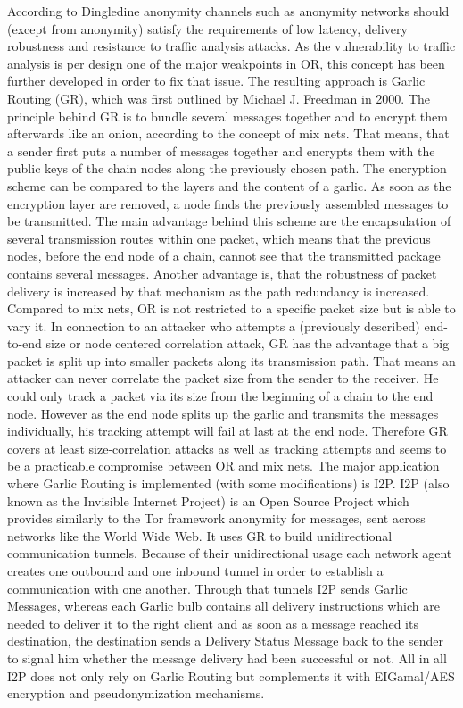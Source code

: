\documentclass{sig-alternate}
\begin{document}
According to Dingledine\cite{dingledine2000free} anonymity channels such as anonymity networks should (except from anonymity) satisfy the requirements of low latency, delivery robustness and resistance to traffic analysis attacks. As the vulnerability to traffic analysis is per design one of the major weakpoints in OR, this concept has been further developed in order to fix that issue. The resulting approach is Garlic Routing (GR), which was first outlined by Michael J. Freedman in 2000. The principle behind GR is to bundle several messages together and to encrypt them afterwards like an onion, according to the concept of mix nets. That means, that a sender first puts a number of messages together and encrypts them with the public keys of the chain nodes along the previously chosen path. The encryption scheme can be compared to the layers and the content of a garlic. As soon as the encryption layer are removed, a node finds the previously assembled messages to be transmitted. The main advantage behind this scheme are the encapsulation of several transmission routes within one packet, which means that the previous nodes, before the end node of a chain, cannot see that the transmitted package contains several messages. Another advantage is, that the robustness of packet delivery is increased by that mechanism as the path redundancy is increased. Compared to mix nets, OR is not restricted to a specific packet size but is able to vary it. In connection to an attacker who attempts a (previously described) end-to-end size or node centered correlation attack, GR has the advantage that a big packet is split up into smaller packets along its transmission path. That means an attacker can never correlate the packet size from the sender to the receiver. He could only track a packet via its size from the beginning of a chain to the end node. However as the end node splits up the garlic and transmits the messages individually, his tracking attempt will fail at last at the end node. Therefore GR covers at least size-correlation attacks as well as tracking attempts and seems to be a practicable compromise between OR and mix nets. The major application where Garlic Routing is implemented (with some modifications) is I2P\cite{i2p}. I2P (also known as the Invisible Internet Project) is an Open Source Project which provides similarly to the Tor framework anonymity for messages, sent across networks like the World Wide Web. It uses GR to build unidirectional communication tunnels. Because of their unidirectional usage each network agent creates one outbound and one inbound tunnel in order to establish a communication with one another. Through that tunnels I2P sends Garlic Messages, whereas each Garlic bulb contains all delivery instructions which are needed to deliver it to the right client and as soon as a message reached its destination, the destination sends a Delivery Status Message back to the sender to signal him whether the message delivery had been successful or not. All in all I2P does not only rely on Garlic Routing but complements it with EIGamal/AES encryption and pseudonymization mechanisms. 
\end{document}
